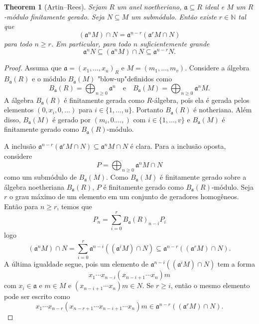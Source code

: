 \documentclass[12pt]{amsart}
\renewcommand{\a}{\mathfrak a}
\newcommand{\N}{\mathbb N}
\newtheorem{theorem}{Theorem}
\theoremstyle{definition}
\begin{document}
\begin{theorem}[Artin--Rees]
Sejam $R$ um anel noetheriano, $\a\subseteq R$ ideal e $M$ um $R$-módulo finitamente gerado. Seja $N\subseteq M$
um submódulo. Então existe $r\in\N$ tal que 
\[
    (\a^nM)\cap N=\a^{n-r}(\a^r M\cap N)
\]
para todo $n\geq r$. Em particular, para todo $n$ suficientemente grande
\[
\a^nN\subseteq (\a^nM)\cap N\subseteq \a^{n-r}N.
\]
\end{theorem}
\begin{proof}
    Assuma que $\a=(x_1,\ldots,x_u)_R$ e $M=(m_1,\ldots,m_v)$. 
    Considere a álgebra $B_\a(R)$ e o módulo $B_\a(M)$ "blow-up"definidos como 
\[
    B_\a(R)=\bigoplus_{n\geq 0}\a^n\quad\mbox{e}\quad
    B_\a(M)=\bigoplus_{n\geq 0}\a^nM.
\]
A álgebra $B_\a(R)$ é finitamente gerada como $R$-álgebra, pois ela é gerada pelos 
elementos $(0,x_i,0,\ldots)$ para $i\in\{1,\ldots,u\}$. Portanto $B_\a(R)$ é notheriana.
Além disso, $B_\a(M)$ é gerado por $(m_i,0.\ldots,)$ com $i\in\{1,\ldots,v\}$ e $B_\a(M)$ é finitamente
gerado como $B_\a(R)$-módulo. 

A inclusão $\a^{n-r}(\a^rM\cap N)\subseteq \a^nM\cap N$ é clara. Para 
a inclusão oposta, considere 
\[
    P=\bigoplus_{n\geq 0}\a^nM\cap N
\]
como um submódulo de $B_\a(M)$. Como $B_\a(M)$ é finitamente gerado sobre a álgebra noetheriana $B_\a(R)$, $P$ é finitamente gerado como $B_\a(R)$-módulo. Seja $r$ o grau máximo de 
um elemento em um conjunto de geradores homogêneos. Então para $n\geq r$, temos que 
\[
    P_n=\sum_{i=0}^r B_\a(R)_{n-i}P_i
\]
logo 
\[
    (\a^n M)\cap N=\sum_{i=0}^r \a^{n-i}((\a^iM)\cap N)\subseteq \a^{n-r}((\a^rM)\cap N).
\]
A  última igualdade segue, pois um elemento de $\a^{n-i}((\a^iM)\cap N)$ tem a forma 
\[
    x_1\cdots x_{n-i}(x_{n-i+1}\cdots x_n)m
\]
com $x_i\in\a$ e $m\in M$ e $(x_{n-i+1}\cdots x_n)m\in N$. Se $r\geq i$, então o mesmo elemento pode ser escrito como 
\[
    x_1\cdots x_{n-r}(x_{n-r+1}\cdots x_{n-i+1}\cdots x_n)m\in \a^{n-r}((\a^r M)\cap N).
\]
\end{proof}
\end{document}
